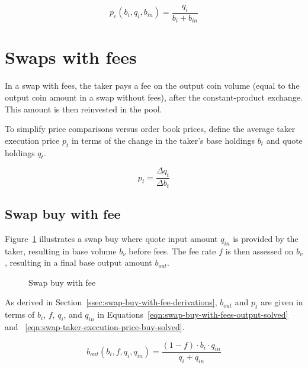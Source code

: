 \documentclass[table, twocolumn]{article}
\begin{document}
\begin{equation}\label{eqn:swap-sell-execution-price-solved}
	p_e (b_i, q_i, b_{in}) = \frac{q_i}{b_i + b_{in}}
\end{equation}

\section{Swaps with fees}\label{sec:swaps-with-fees}

In a swap with fees, the taker pays a fee on the output coin volume (equal to the output
coin amount in a swap without fees), after the constant-product exchange. This amount is
then reinvested in the pool.

To simplify price comparisons versus order book prices, define the average taker
execution price $p_t$ in terms of the change in the taker's base holdings $b_t$ and
quote holdings $q_t$.

\begin{equation}\label{eqn:swap-taker-execution-price}
  p_t = \frac{\Delta q_t}{\Delta b_t}
\end{equation}

\subsection{Swap buy with fee}\label{ssec:swap-buy-with-fee}

Figure~\ref{fig:swap-buy-with-fee} illustrates a swap buy where quote input amount
$q_{in}$ is provided by the taker, resulting in base volume $b_v$ before fees. The fee
rate $f$ is then assessed on $b_v$, resulting in a final base output amount $b_{out}$.

\begin{figure}[!htb]
	\centering
	
	\caption{Swap buy with fee}\label{fig:swap-buy-with-fee}
\end{figure}

As derived in Section~\ref{ssec:swap-buy-with-fee-derivations}, $b_{out}$ and $p_t$ are
given in terms of $b_i$, $f$, $q_i$, and $q_{in}$ in
Equations~\ref{eqn:swap-buy-with-fees-output-solved} and%
~\ref{eqn:swap-taker-execution-price-buy-solved}.

\begin{equation}\label{eqn:swap-buy-with-fees-output-solved}
  b_{out} (b_i, f, q_i, q_{in}) =
  \frac{(1 - f) \cdot b_i \cdot q_{in}}{q_i + q_{in}}
\end{equation}
\end{document}
